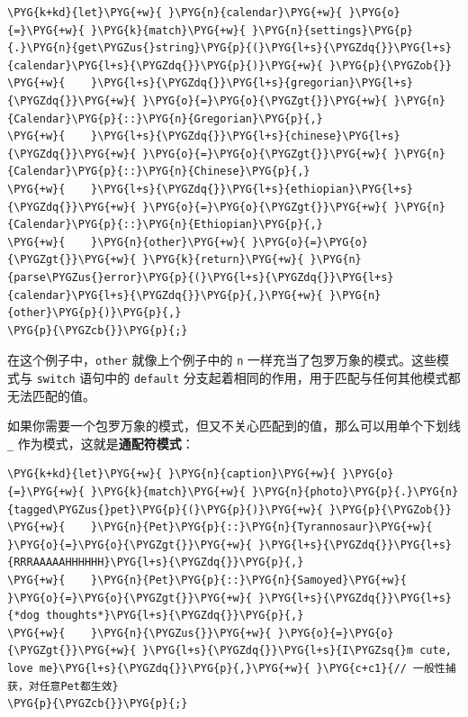 \begin{Verbatim}[commandchars=\\\{\},breaklines=true,breakanywhere=true,fontsize=\codefont,xleftmargin=17bp]
\PYG{k+kd}{let}\PYG{+w}{ }\PYG{n}{calendar}\PYG{+w}{ }\PYG{o}{=}\PYG{+w}{ }\PYG{k}{match}\PYG{+w}{ }\PYG{n}{settings}\PYG{p}{.}\PYG{n}{get\PYGZus{}string}\PYG{p}{(}\PYG{l+s}{\PYGZdq{}}\PYG{l+s}{calendar}\PYG{l+s}{\PYGZdq{}}\PYG{p}{)}\PYG{+w}{ }\PYG{p}{\PYGZob{}}
\PYG{+w}{    }\PYG{l+s}{\PYGZdq{}}\PYG{l+s}{gregorian}\PYG{l+s}{\PYGZdq{}}\PYG{+w}{ }\PYG{o}{=}\PYG{o}{\PYGZgt{}}\PYG{+w}{ }\PYG{n}{Calendar}\PYG{p}{::}\PYG{n}{Gregorian}\PYG{p}{,}
\PYG{+w}{    }\PYG{l+s}{\PYGZdq{}}\PYG{l+s}{chinese}\PYG{l+s}{\PYGZdq{}}\PYG{+w}{ }\PYG{o}{=}\PYG{o}{\PYGZgt{}}\PYG{+w}{ }\PYG{n}{Calendar}\PYG{p}{::}\PYG{n}{Chinese}\PYG{p}{,}
\PYG{+w}{    }\PYG{l+s}{\PYGZdq{}}\PYG{l+s}{ethiopian}\PYG{l+s}{\PYGZdq{}}\PYG{+w}{ }\PYG{o}{=}\PYG{o}{\PYGZgt{}}\PYG{+w}{ }\PYG{n}{Calendar}\PYG{p}{::}\PYG{n}{Ethiopian}\PYG{p}{,}
\PYG{+w}{    }\PYG{n}{other}\PYG{+w}{ }\PYG{o}{=}\PYG{o}{\PYGZgt{}}\PYG{+w}{ }\PYG{k}{return}\PYG{+w}{ }\PYG{n}{parse\PYGZus{}error}\PYG{p}{(}\PYG{l+s}{\PYGZdq{}}\PYG{l+s}{calendar}\PYG{l+s}{\PYGZdq{}}\PYG{p}{,}\PYG{+w}{ }\PYG{n}{other}\PYG{p}{)}\PYG{p}{,}
\PYG{p}{\PYGZcb{}}\PYG{p}{;}
\end{Verbatim}

在这个例子中，\texttt{other} 就像上个例子中的 \texttt{n} 一样充当了包罗万象的模式。这些模式与 \texttt{switch} 语句中的 \texttt{default} 分支起着相同的作用，用于匹配与任何其他模式都无法匹配的值。

如果你需要一个包罗万象的模式，但又不关心匹配到的值，那么可以用单个下划线 \texttt{\_} 作为模式，这就是\textbf{通配符模式}：

\begin{Verbatim}[commandchars=\\\{\},breaklines=true,breakanywhere=true,fontsize=\codefont,xleftmargin=17bp]
\PYG{k+kd}{let}\PYG{+w}{ }\PYG{n}{caption}\PYG{+w}{ }\PYG{o}{=}\PYG{+w}{ }\PYG{k}{match}\PYG{+w}{ }\PYG{n}{photo}\PYG{p}{.}\PYG{n}{tagged\PYGZus{}pet}\PYG{p}{(}\PYG{p}{)}\PYG{+w}{ }\PYG{p}{\PYGZob{}}
\PYG{+w}{    }\PYG{n}{Pet}\PYG{p}{::}\PYG{n}{Tyrannosaur}\PYG{+w}{ }\PYG{o}{=}\PYG{o}{\PYGZgt{}}\PYG{+w}{ }\PYG{l+s}{\PYGZdq{}}\PYG{l+s}{RRRAAAAAHHHHHH}\PYG{l+s}{\PYGZdq{}}\PYG{p}{,}
\PYG{+w}{    }\PYG{n}{Pet}\PYG{p}{::}\PYG{n}{Samoyed}\PYG{+w}{ }\PYG{o}{=}\PYG{o}{\PYGZgt{}}\PYG{+w}{ }\PYG{l+s}{\PYGZdq{}}\PYG{l+s}{*dog thoughts*}\PYG{l+s}{\PYGZdq{}}\PYG{p}{,}
\PYG{+w}{    }\PYG{n}{\PYGZus{}}\PYG{+w}{ }\PYG{o}{=}\PYG{o}{\PYGZgt{}}\PYG{+w}{ }\PYG{l+s}{\PYGZdq{}}\PYG{l+s}{I\PYGZsq{}m cute, love me}\PYG{l+s}{\PYGZdq{}}\PYG{p}{,}\PYG{+w}{ }\PYG{c+c1}{// 一般性捕获，对任意Pet都生效}
\PYG{p}{\PYGZcb{}}\PYG{p}{;}
\end{Verbatim}

